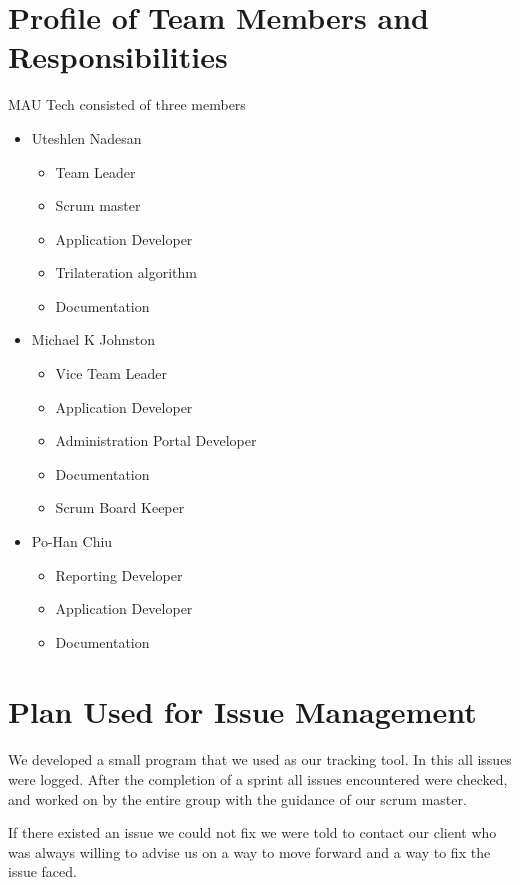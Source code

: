 \documentclass{article}
\begin{document}
\section{Profile of Team Members and Responsibilities}
MAU Tech consisted of three members
\begin{itemize}
\item Uteshlen Nadesan
\begin{itemize}
\item Team Leader
\item Scrum master
\item Application Developer
\item Trilateration algorithm
\item Documentation
\end{itemize}
\item Michael K Johnston
\begin{itemize}
\item Vice Team Leader
\item Application Developer
\item Administration Portal Developer
\item Documentation
\item Scrum Board Keeper
\end{itemize}
\item Po-Han Chiu
\begin{itemize}
\item Reporting Developer
\item Application Developer
\item Documentation
\end{itemize}
\end{itemize}

\newpage
\section{Plan Used for Issue Management}
\paragraph{}We developed a small program that we used as our tracking tool. In this all issues were logged. After the completion of a sprint all issues encountered were checked, and worked on by the entire group with the guidance of our scrum master. 


If there existed an issue we could not fix we were told to contact our client who was always willing to advise us on a way to move forward and a way to fix the issue faced.
\end{document}
